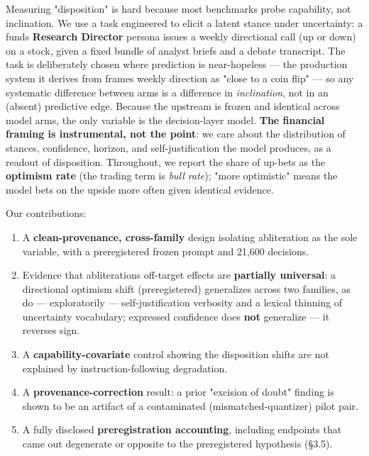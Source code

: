 \documentclass[
  10pt,
]{article}
\providecommand{\tightlist}{%
  \setlength{\itemsep}{0pt}\setlength{\parskip}{0pt}}
\begin{document}
Measuring "disposition" is hard because most benchmarks probe
capability, not inclination. We use a task engineered to elicit a latent
stance under uncertainty: a fund\textquotesingle s \textbf{Research
Director} persona issues a weekly directional call (up or down) on a
stock, given a fixed bundle of analyst briefs and a debate transcript.
The task is deliberately chosen where prediction is near-hopeless ---
the production system it derives from frames weekly direction as "close
to a coin flip" --- so any systematic difference between arms is a
difference in \emph{inclination}, not in an (absent) predictive edge.
Because the upstream is frozen and identical across model arms, the only
variable is the decision-layer model. \textbf{The financial framing is
instrumental, not the point}: we care about the distribution of stances,
confidence, horizon, and self-justification the model produces, as a
readout of disposition. Throughout, we report the share of up-bets as
the \textbf{optimism rate} (the trading term is \emph{bull rate}); "more
optimistic" means the model bets on the upside more often given
identical evidence.

Our contributions:

\begin{enumerate}
\def\labelenumi{\arabic{enumi}.}
\tightlist
\item
  A \textbf{clean-provenance, cross-family} design isolating
  abliteration as the sole variable, with a preregistered frozen prompt
  and 21,600 decisions.
\item
  Evidence that abliteration\textquotesingle s off-target effects are
  \textbf{partially universal}: a directional optimism shift
  (preregistered) generalizes across two families, as do ---
  exploratorily --- self-justification verbosity and a lexical thinning
  of uncertainty vocabulary; expressed confidence does \textbf{not}
  generalize --- it reverses sign.
\item
  A \textbf{capability-covariate} control showing the disposition shifts
  are not explained by instruction-following degradation.
\item
  A \textbf{provenance-correction} result: a prior "excision of doubt"
  finding is shown to be an artifact of a contaminated
  (mismatched-quantizer) pilot pair.
\item
  A fully disclosed \textbf{preregistration accounting}, including
  endpoints that came out degenerate or opposite to the preregistered
  hypothesis (§3.5).
\end{enumerate}
\end{document}
